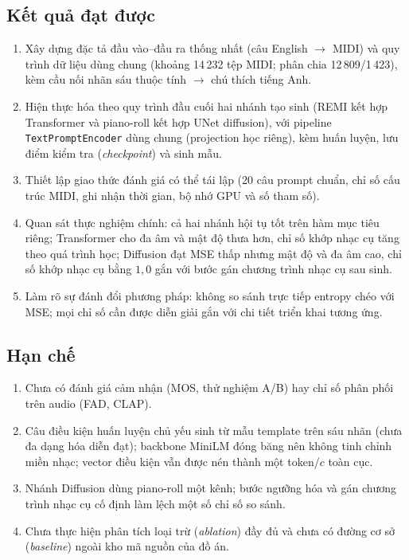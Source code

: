 \documentclass[oneside, a4paper, 12pt]{book}
\theoremstyle{plain}
\theoremstyle{definition}
\theoremstyle{remark}
\begin{document}
\subsection*{Kết quả đạt được}

\begin{enumerate}
    \item Xây dựng đặc tả đầu vào--đầu ra thống nhất (câu English $\rightarrow$ MIDI) và quy trình dữ liệu dùng chung (khoảng 14\,232 tệp MIDI; phân chia 12\,809/1\,423), kèm cầu nối nhãn sáu thuộc tính $\rightarrow$ chú thích tiếng Anh.
    \item Hiện thực hóa theo quy trình đầu cuối hai nhánh tạo sinh (REMI kết hợp Transformer và piano-roll kết hợp UNet diffusion), với pipeline \texttt{TextPromptEncoder} dùng chung (projection học riêng), kèm huấn luyện, lưu điểm kiểm tra (\textit{checkpoint}) và sinh mẫu.
    \item Thiết lập giao thức đánh giá có thể tái lập (20 câu prompt chuẩn, chỉ số cấu trúc MIDI, ghi nhận thời gian, bộ nhớ GPU và số tham số).
    \item Quan sát thực nghiệm chính: cả hai nhánh hội tụ tốt trên hàm mục tiêu riêng; Transformer cho đa âm và mật độ thưa hơn, chỉ số khớp nhạc cụ tăng theo quá trình học; Diffusion đạt MSE thấp nhưng mật độ và đa âm cao, chỉ số khớp nhạc cụ bằng $1{,}0$ gắn với bước gán chương trình nhạc cụ sau sinh.
    \item Làm rõ sự đánh đổi phương pháp: không so sánh trực tiếp entropy chéo với MSE; mọi chỉ số cần được diễn giải gắn với chi tiết triển khai tương ứng.
\end{enumerate}

\subsection*{Hạn chế}

\begin{enumerate}
    \item Chưa có đánh giá cảm nhận (MOS, thử nghiệm A/B) hay chỉ số phân phối trên audio (FAD, CLAP).
    \item Câu điều kiện huấn luyện chủ yếu sinh từ mẫu template trên sáu nhãn (chưa đa dạng hóa diễn đạt); backbone MiniLM đóng băng nên không tinh chỉnh miền nhạc; vector điều kiện vẫn được nén thành một token/$c$ toàn cục.
    \item Nhánh Diffusion dùng piano-roll một kênh; bước ngưỡng hóa và gán chương trình nhạc cụ cố định làm lệch một số chỉ số so sánh.
    \item Chưa thực hiện phân tích loại trừ (\textit{ablation}) đầy đủ và chưa có đường cơ sở (\textit{baseline}) ngoài kho mã nguồn của đồ án.
\end{enumerate}
\end{document}
